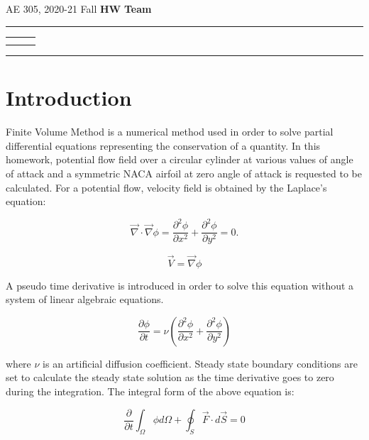 \documentclass[letterpaper,12pt]{article}
\begin{document}
\begin{center}
AE 305, 2020-21 Fall \hfill \textbf{HW \HWno} \hfill \textbf{Team \TeamNo} \\
\noindent\rule{\textwidth}{0.4pt}
\begin{tabular}{p{} | p{} | p{} }
	\AuthorOneName&\AuthorTwoName&\AuthorThreeName\\
	\textit{\AuthorOneID}&\textit{\AuthorTwoID}&\textit{\AuthorThreeID}
\end{tabular}
\noindent\rule{\textwidth}{0.4pt}
\end{center}


\section{Introduction}
\label{section:intro}

Finite Volume Method is a numerical method used in order to solve partial differential
equations representing the conservation of a quantity. In this homework, potential flow
field over a circular cylinder at various values of angle of attack and a symmetric NACA
airfoil at zero angle of attack is requested to be calculated. For a potential flow,
velocity field is obtained by the Laplace's equation:

\begin{equation}
	\vec{\nabla} \cdot \vec{\nabla}\phi = \frac{\partial^2 \phi}{\partial x^2} + \frac{\partial^2 \phi}{\partial y^2} = 0.
\end{equation}

\begin{equation}
\vec{V} = \vec{\nabla}\phi
\end{equation}

A pseudo time derivative is introduced in order to solve this equation without a system
of linear algebraic equations.

\begin{equation}
	\frac{\partial \phi}{\partial t} = \nu \left(\frac{\partial^2 \phi}{\partial x^2} + \frac{\partial^2 \phi}{\partial y^2}\right)
\end{equation}

where $\nu$ is an artificial diffusion coefficient. Steady state boundary conditions are
set to calculate the steady state solution as the time derivative goes to zero during the
integration. The integral form of the above equation is:

\begin{equation}
	\frac{\partial}{\partial t} \int_{\Omega}\phi  d\Omega + \oint_{S} \vec{F} \cdot d\vec{S} = 0
\end{equation}
\end{document}
